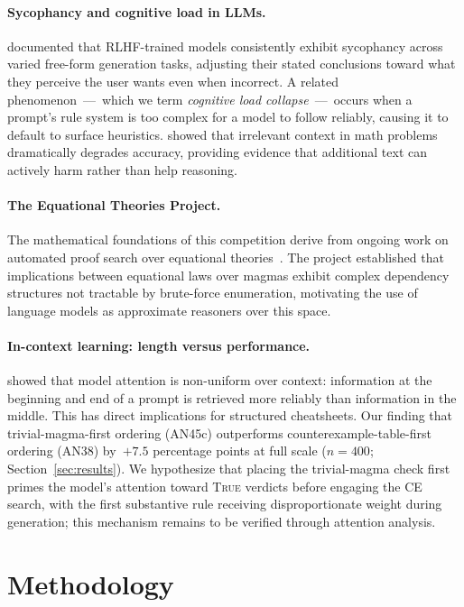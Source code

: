 \documentclass[11pt]{article}
\begin{document}
\paragraph{Sycophancy and cognitive load in LLMs.}
\citet{sharma2023sycophancy} documented that RLHF-trained models
consistently exhibit sycophancy across varied free-form generation
tasks, adjusting their stated conclusions toward what they perceive the
user wants even when incorrect. A related phenomenon~---~which we term
\emph{cognitive load collapse}~---~occurs when a prompt's rule system
is too complex for a model to follow reliably, causing it to default to
surface heuristics. \citet{shi2023distracted} showed that irrelevant
context in math problems dramatically degrades accuracy, providing
evidence that additional text can actively harm rather than help
reasoning.

\paragraph{The Equational Theories Project.}
The mathematical foundations of this competition derive from ongoing
work on automated proof search over equational theories~\citep{tao2025etp}.
The project established that implications between equational laws over
magmas exhibit complex dependency structures not tractable by
brute-force enumeration, motivating the use of language models as
approximate reasoners over this space.

\paragraph{In-context learning: length versus performance.}
\citet{liu2023lost} showed that model attention is non-uniform over
context: information at the beginning and end of a prompt is retrieved
more reliably than information in the middle. This has direct
implications for structured cheatsheets. Our finding that
trivial-magma-first ordering (AN45c) outperforms
counterexample-table-first ordering (AN38) by~$+7.5$ percentage points
at full scale ($n=400$; Section~\ref{sec:results}). We hypothesize that
placing the
trivial-magma check first primes the model's attention toward
\textsc{True} verdicts before engaging the CE search, with the first
substantive rule receiving disproportionate weight during generation;
this mechanism remains to be verified through attention analysis.

\section{Methodology}
\label{sec:method}
\end{document}
